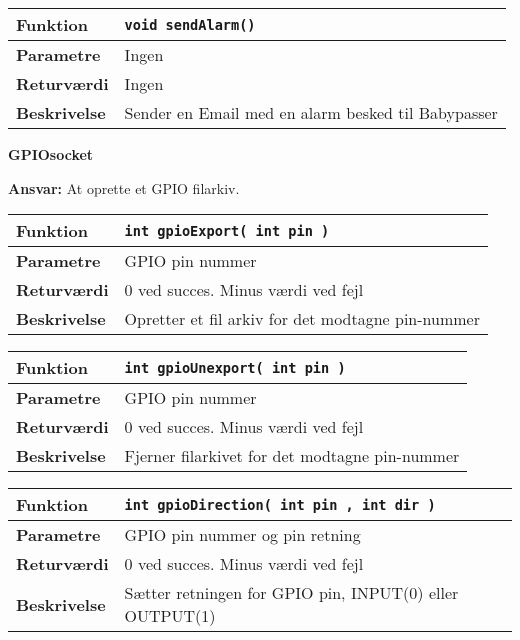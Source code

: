 \begin{center}
    \begin{tabular}{ | l | p{} |}
    \hline
    \textbf{Funktion}	& \verb+void sendAlarm() +							\\ \hline
    \textbf{Parametre} 	& Ingen												\\ \hline
    \textbf{Returværdi}	& Ingen												\\ \hline
    \textbf{Beskrivelse}	& Sender en Email med en alarm besked til Babypasser	\\ \hline
    \end{tabular}
\end{center}

{\centering
\textbf{GPIOsocket}\par
}
\textbf{Ansvar:} At oprette et GPIO filarkiv. \

\begin{center}
    \begin{tabular}{ | l | p{} |}
    \hline
    \textbf{Funktion}	& \verb+int gpioExport( int pin ) +					\\ \hline
    \textbf{Parametre} 	& GPIO pin nummer									\\ \hline
    \textbf{Returværdi}	& 0 ved succes. Minus værdi ved fejl					\\ \hline
    \textbf{Beskrivelse}	& Opretter et fil arkiv for det modtagne pin-nummer	\\ \hline
    \end{tabular}
\end{center}

\begin{center}
    \begin{tabular}{ | l | p{} |}
    \hline
    \textbf{Funktion}	& \verb+int gpioUnexport( int pin ) +			\\ \hline
    \textbf{Parametre} 	& GPIO pin nummer								\\ \hline
    \textbf{Returværdi}	& 0 ved succes. Minus værdi ved fejl				\\ \hline
    \textbf{Beskrivelse}	& Fjerner filarkivet for det modtagne pin-nummer	\\ \hline
    \end{tabular}
\end{center}

\begin{center}
    \begin{tabular}{ | l | p{} |}
    \hline
    \textbf{Funktion}	& \verb+int gpioDirection( int pin , int dir ) +			\\ \hline
    \textbf{Parametre} 	& GPIO pin nummer og pin retning							\\ \hline
    \textbf{Returværdi}	& 0 ved succes. Minus værdi ved fejl						\\ \hline
    \textbf{Beskrivelse}	& Sætter retningen for GPIO pin, INPUT(0) eller OUTPUT(1)	\\ \hline
    \end{tabular}
\end{center}

